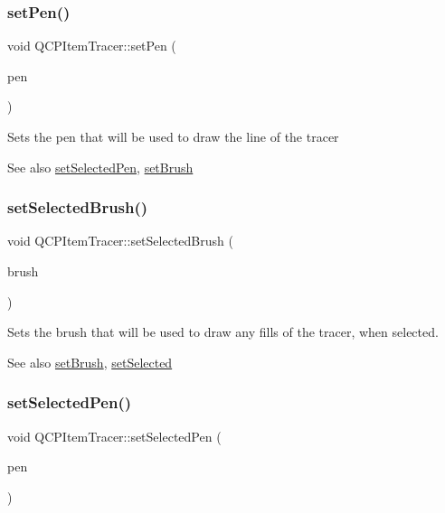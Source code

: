\subsubsection{\texorpdfstring{set\+Pen()}{setPen()}}
{\footnotesize\ttfamily void Q\+C\+P\+Item\+Tracer\+::set\+Pen (\begin{DoxyParamCaption}\item[{const Q\+Pen \&}]{pen }\end{DoxyParamCaption})}

Sets the pen that will be used to draw the line of the tracer

\begin{DoxySeeAlso}{See also}
\hyperlink{class_q_c_p_item_tracer_ae1bf70db7f13f928660168cd3e5069f3}{set\+Selected\+Pen}, \hyperlink{class_q_c_p_item_tracer_a2c303f7470a30084daa201ed556b3c36}{set\+Brush} 
\end{DoxySeeAlso}
\mbox{\label{class_q_c_p_item_tracer_a0f55c084980a7a312af859d3e7b558ef}} 
\subsubsection{\texorpdfstring{set\+Selected\+Brush()}{setSelectedBrush()}}
{\footnotesize\ttfamily void Q\+C\+P\+Item\+Tracer\+::set\+Selected\+Brush (\begin{DoxyParamCaption}\item[{const Q\+Brush \&}]{brush }\end{DoxyParamCaption})}

Sets the brush that will be used to draw any fills of the tracer, when selected.

\begin{DoxySeeAlso}{See also}
\hyperlink{class_q_c_p_item_tracer_a2c303f7470a30084daa201ed556b3c36}{set\+Brush}, \hyperlink{class_q_c_p_abstract_item_a203de94ad586cc44d16c9565f49d3378}{set\+Selected} 
\end{DoxySeeAlso}
\mbox{\label{class_q_c_p_item_tracer_ae1bf70db7f13f928660168cd3e5069f3}} 
\subsubsection{\texorpdfstring{set\+Selected\+Pen()}{setSelectedPen()}}
{\footnotesize\ttfamily void Q\+C\+P\+Item\+Tracer\+::set\+Selected\+Pen (\begin{DoxyParamCaption}\item[{const Q\+Pen \&}]{pen }\end{DoxyParamCaption})}

